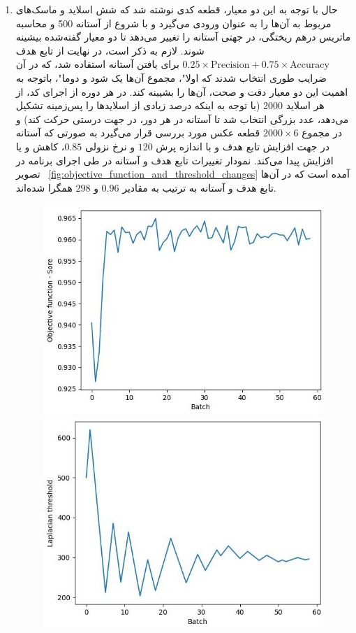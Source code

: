 \begin{enumerate}
    \item حال با توجه به این دو معیار، قطعه کدی نوشته شد که شش اسلاید و ماسک‌های مربوط به آن‌ها را به عنوان ورودی می‌گیرد و با شروع از آستانه 500 و محاسبه ماتریس درهم ریختگی، در جهتی آستانه را تغییر می‌دهد تا دو معیار گفته‌شده بیشینه شوند.
    لازم به ذکر است، در نهایت از تابع هدف
     $0.25\times\text{Precision}+0.75\times\text{Accuracy}$
      برای یافتن آستانه استفاده شد، که در آن ضرایب طوری انتخاب شدند که اولا"، مجموع آن‌ها یک شود و دوما"، باتوجه به اهمیت این دو معیار دقت و صحت، آن‌ها را بشیینه کند. 
    در هر دوره از اجرای کد، از هر اسلاید 2000 (با توجه به اینکه درصد زیادی از اسلاید‌ها را پس‌زمینه تشکیل می‌دهد، عدد بزرگی انتخاب شد تا آستانه در هر دور، در جهت درستی حرکت کند) و در مجموع
     $2000 \times 6$ 
     قطعه عکس مورد بررسی قرار می‌گیرد به صورتی که آستانه در جهت افزایش تابع هدف و با اندازه پرش $120$ و نرخ نزولی $0.85$، کاهش و یا افزایش پیدا می‌کند.
    نمودار تغییرات تابع هدف و آستانه در طی اجرای برنامه در تصویر ~\ref{fig:objective_function_and_threshold_changes} آمده است که در آن‌ها تابع هدف و آستانه به ترتیب به مقادیر $0.96$ و $298$ همگرا شده‌اند.
    \begin{figure}
        \begin{center}
            \includegraphics[width=0.48\linewidth]{figs/introduction/subs/challenges/laplacian_threshold_score_history_chart.jpeg}
            \includegraphics[width=0.48\linewidth]{figs/introduction/subs/challenges/laplacian_threshold_history_chart.jpeg}
        \end{center}

\end{figure}
\end{enumerate}
